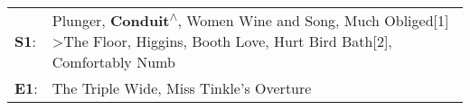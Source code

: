 \begin{supertabular}{p{0.03\textwidth}p{0.92\textwidth}}
 \textbf{S1}:  &  Plunger\textsuperscript{}, \enspace \textbf{Conduit\textsuperscript{$\wedge$}}, \enspace Women Wine and Song\textsuperscript{}, \enspace Much Obliged[1]\textsuperscript{} \textgreater \enspace The Floor\textsuperscript{}, \enspace Higgins\textsuperscript{}, \enspace Booth Love\textsuperscript{}, \enspace Hurt Bird Bath[2]\textsuperscript{}, \enspace Comfortably Numb\textsuperscript{}  \enspace  \\
 \textbf{E1}:  &                                                                                                                                                                                                                                                                                                                The Triple Wide\textsuperscript{}, \enspace Miss Tinkle's Overture\textsuperscript{}  \enspace  \\
\end{supertabular}
